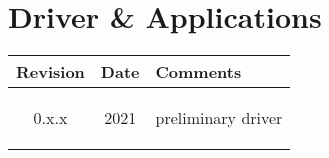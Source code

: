 \section{Driver \& Applications}
\begin{tabularx}{\textwidth}{|c|c|X|}
    \hline
    Revision & Date & Comments\\
    \hline\hline
    \hypertarget{drvrev}{0.x.x} & 2021 & preliminary driver\\
    \hline
 
\end{tabularx}
